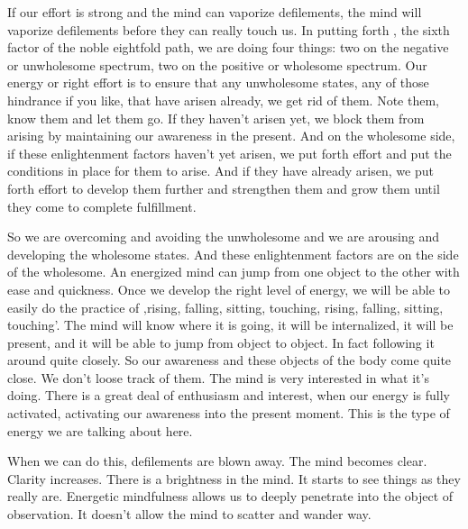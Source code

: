 \documentclass[letterpaper,10pt,english]{sphinxmanual}
\begin{document}
\sphinxAtStartPar
If our effort is strong and the mind can vaporize defilements, the mind
will  vaporize  defilements  before  they  can  really  touch  us.  In  putting  forth
, the sixth factor of the noble eightfold path, we are doing four
  things: two on the negative or unwholesome spectrum, two on the positive
or  wholesome  spectrum.  Our  energy  or  right  effort  is  to  ensure  that  any
unwholesome  states,  any  of  those  hindrance  if  you  like,  that  have  arisen
already, we get rid of them. Note them, know them and let them go. If they
haven’t arisen yet, we block them from arising by maintaining our awareness in the present. And on the wholesome side, if these enlightenment factors haven’t yet arisen, we put forth effort and put the conditions in place for
them to arise. And if they have already arisen, we put forth effort to develop
them further and strengthen them and grow them until they come to complete fulfillment.

\sphinxAtStartPar
So  we  are  overcoming  and  avoiding  the  unwholesome  and  we  are
arousing  and  developing  the  wholesome  states.  And  these  enlightenment
factors are on the side of the wholesome. An energized mind can jump from
one object to the other with ease and quickness. Once we develop the right
level  of  energy,  we  will  be  able  to  easily  do  the  practice  of  ‚rising,  falling, sitting, touching, rising, falling, sitting, touching’. The mind will know
where  it  is  going,  it  will  be  internalized,  it  will  be  present,  and  it  will  be
able to jump from object to object. In fact following it around quite closely.
So our awareness and these objects of the body come quite close. We don’t
loose track of them. The mind is very interested in what it’s doing. There is
a great deal of enthusiasm and interest, when our energy is fully activated,
activating our awareness into the present moment. This is the type of energy
we are talking about here.

\sphinxAtStartPar
When we can do this, defilements are blown away. The mind becomes
clear.  Clarity  increases.  There  is  a  brightness  in  the  mind.  It  starts  to  see
things  as  they  really  are.  Energetic  mindfulness  allows  us  to  deeply  penetrate into the object of observation. It doesn’t allow the mind to scatter and
wander way.
\end{document}
